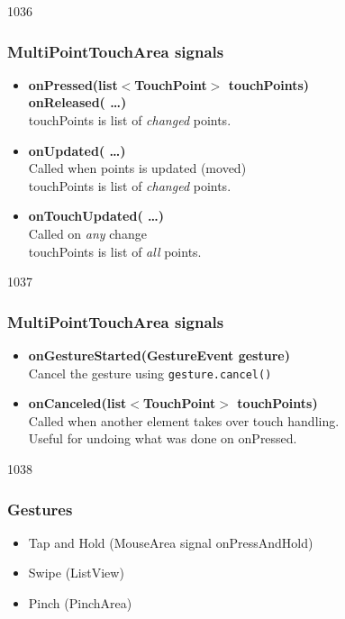 \begin{slide}{1036}\frametitle{MultiPointTouchArea signals}

\begin{itemize}
\item \textbf{onPressed(list$<$TouchPoint$>$ touchPoints)}\\
  \textbf{onReleased( \ldots )}\\
  touchPoints is list of \textit{changed} points.\medskip

\item \textbf{onUpdated( \ldots )}\\
  Called when points is updated (moved)\\
  touchPoints is list of \textit{changed} points.\medskip

\item \textbf{onTouchUpdated( \ldots )}\\
  Called on \textit{any} change\\
  touchPoints is list of \textit{all} points.
\end{itemize}

\end{slide}

\begin{slide}{1037}\frametitle{MultiPointTouchArea signals}

\begin{itemize}
\item \textbf{onGestureStarted(GestureEvent gesture)}\\
  Cancel the gesture using \texttt{gesture.cancel()}\medskip

\item \textbf{onCanceled(list$<$TouchPoint$>$ touchPoints)}\\
  Called when another element takes over touch handling.\\
  Useful for undoing what was done on onPressed.
\end{itemize}

\end{slide}


\begin{slide}{1038}\frametitle{Gestures}

\begin{itemize}
  \item Tap and Hold (MouseArea signal onPressAndHold)
  \item Swipe (ListView)
  \item Pinch (PinchArea)
\end{itemize}

\end{slide}

